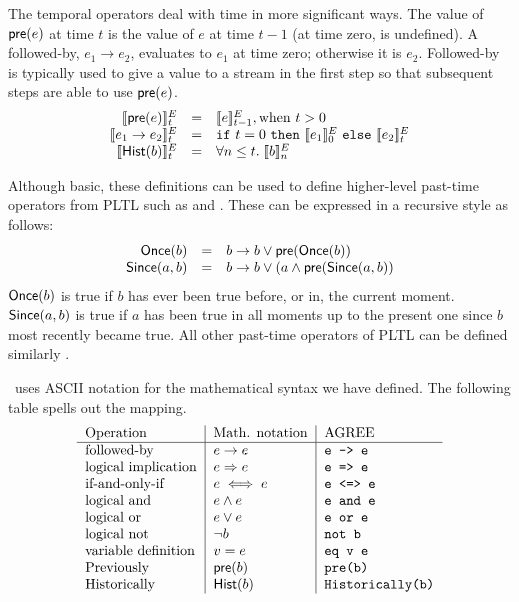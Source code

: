 The temporal operators deal with time in more significant ways. The
value of $\mathsf{pre}(e)$ at time $t$ is the value of $e$ at time
$t-1$ (at time zero,  is undefined).  A followed-by, $e_1
\to e_2$, evaluates to $e_1$ at time zero; otherwise it is $e_2$.
Followed-by is typically used to give a value to a stream in the first
step so that subsequent steps are able to use $\mathsf{pre}(e)$.
\[
\begin{array}{rcl}
\sem{\konst{pre}(e)}^E_t & = & \sem{e}^E_{t-1}, \mathrm{when}\ t > 0 \\
\sem{e_1 \to e_2}^E_t & = & \itelse{t=0}{\sem{e_1}^E_0}{\sem{e_2}^E_t} \\
\sem{\konst{Hist}(b)}^E_t & = & \forall n \leq t.\; \sem{b}^E_n
\end{array}
\]

Although basic, these definitions can be used to define higher-level
past-time operators from PLTL such as  and .
These can be expressed in a recursive style as follows:
\[
\begin{array}{rcl}
\mathsf{Once}(b) & = & b \to b \vee \mathsf{pre}(\mathsf{Once}(b)) \\
\mathsf{Since}(a, b) & = & b \to b \lor (a \land \mathsf{pre}(\mathsf{Since}(a, b))
\end{array}
\]
\noindent $\mathsf{Once}(b)$ is true if $b$ has ever been true before, or in, the
current moment.  $\mathsf{Since}(a, b)$ is true if $a$ has been true in
all moments up to the present one since $b$ most recently became true.
All other past-time operators of PLTL can be defined similarly \cite{monitor}.

\agr\ uses ASCII notation for the mathematical syntax we have
defined. The following table spells out the mapping.
\[
\begin{tabular}{l|l|l}
 Operation & Math. notation & \agr \\ \hline
 followed-by &  $e \to e$          & \verb+e -> e+  \\
 logical implication &  $e \imp e$ & \verb+e => e+ \\
 if-and-only-if &  $e \iff e$      & \verb+e <=> e+ \\
 logical and &  $e \land e$      & \verb+e and e+ \\
 logical or &  $e \lor e$      & \verb+e or e+ \\
 logical not & $\neg b$      & \verb+not b+ \\
 variable definition & $v = e$     & \verb+eq v e+ \\
 Previously  & $\konst{pre}(b)$ & \verb+pre(b)+ \\
 Historically  & $\konst{Hist}(b)$ & \verb+Historically(b)+ \\
\end{tabular}
\]
